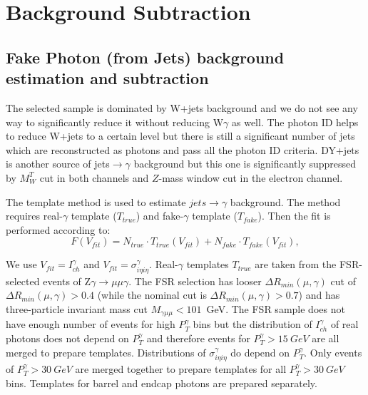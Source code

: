 \section{Background Subtraction}
\label{sec:BackgroundSubtraction}

\subsection{Fake Photon (from Jets) background estimation and subtraction}

The selected sample is dominated by W+jets background and we do not see any way to significantly reduce it without reducing W$\gamma$ as well. The photon ID helps to reduce W+jets to a certain level but there is still a significant number of jets which are reconstructed as photons and pass all the photon ID criteria. DY+jets is another source of jets$\rightarrow \gamma$ background but this one is significantly suppressed by $M_W^T$ cut in both channels and $Z$-mass window cut in the electron channel.

The template method is used to estimate $jets \rightarrow \gamma$ background. The method requires real-$\gamma$ template ($T_{true}$) and fake-$\gamma$ template ($T_{fake}$). Then the fit is performed according to: 
\begin{equation}
F(V_{fit})=N_{true} \cdot T_{true}(V_{fit}) + N_{fake} \cdot T_{fake}(V_{fit}),
\end{equation}

We use $V_{fit}=I_{ch}^{\gamma}$ and $V_{fit}=\sigma_{i\eta i\eta}^{\gamma}$. Real-$\gamma$ templates $T_{true}$ are taken from the FSR-selected events of Z$\gamma\rightarrow\mu\mu\gamma$. The FSR selection has looser $\Delta R_{min}(\mu,\gamma)$ cut of $\Delta R_{min}(\mu,\gamma)>0.4$ (while the nominal cut is $\Delta R_{min}(\mu,\gamma)>0.7$) and has three-particle invariant mass cut $M_{\gamma\mu\mu}<101$~GeV. The FSR sample does not have enough number of events for high $P_{T}^{\gamma}$ bins but the distribution of $I_{ch}^{\gamma}$ of real photons does not depend on $P_{T}^{\gamma}$ and therefore events for $P_{T}^{\gamma}>15~GeV$ are all merged to prepare templates. Distributions of $\sigma_{i\eta i\eta}^{\gamma}$ do depend on $P_T^{\gamma}$. Only events of $P_T^{\gamma}>30~GeV$ are merged together to prepare templates for all $P_T^{\gamma}>30~GeV$ bins. Templates for barrel and endcap photons are prepared separately.

